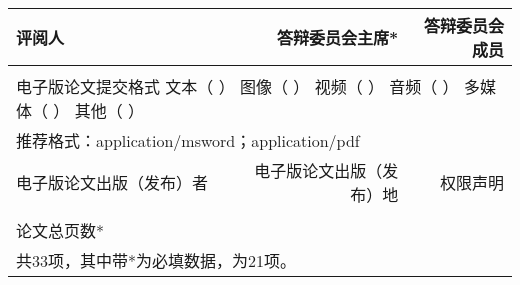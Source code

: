 \begin{table}[htbp]
\begin{tabular}{|p{6.94em}rrrr|}
		\hline
		\multicolumn{1}{|p{6.94em}|}{评阅人} & \multicolumn{2}{p{12.69em}|}{答辩委员会主席*} & \multicolumn{2}{p{13.69em}|}{答辩委员会成员} \\
		\hline
		\multicolumn{1}{|r|}{\multirow{2}[2]{*}{}} & \multicolumn{2}{r|}{\multirow{2}[2]{*}{}} & \multicolumn{2}{r|}{\multirow{2}[2]{*}{}} \\
		\multicolumn{1}{|r|}{} & \multicolumn{2}{r|}{} & \multicolumn{2}{r|}{} \\
		\hline
		\multicolumn{5}{|p{33.32em}|}{电子版论文提交格式  文本（ ）  图像（ ） 视频（ ） 音频（ ） 多媒体（ ） 其他（ ）} \\
		\multicolumn{5}{|p{33.32em}|}{推荐格式：application/msword；application/pdf} \\
		\hline
		\multicolumn{2}{|p{13.005em}|}{电子版论文出版（发布）者} & \multicolumn{2}{p{13.625em}|}{电子版论文出版（发布）地} & \multicolumn{1}{p{6.69em}|}{权限声明} \\
		\hline
		\multicolumn{2}{|r|}{} & \multicolumn{2}{r|}{} &  \\
		\hline
		\multicolumn{1}{|p{6.94em}|}{论文总页数*} & \multicolumn{4}{r|}{} \\
		\hline
		\multicolumn{5}{|p{33.32em}|}{共33项，其中带*为必填数据，为21项。} \\
		\hline
	\end{tabular}%
	\label{tab:addlabel}%
\end{table}%